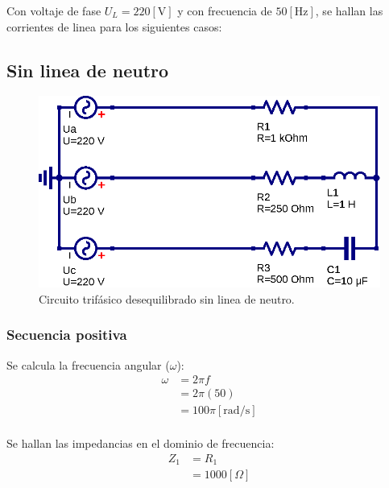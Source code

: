 \documentclass[letter,11pt]{article}
\begin{document}
Con voltaje de fase $U_L=220[\text{V}]$ y con frecuencia de $50[\text{Hz}]$,
se hallan las corrientes de linea para los siguientes casos:
\\

\subsection{Sin linea de neutro}
\begin{figure}[!h]
\centering
\includegraphics[scale=0.9]{figura1.eps}
\caption{Circuito trifásico desequilibrado sin linea de neutro.}
\label{simulacion1}
\end{figure}

\subsubsection{Secuencia positiva}
Se calcula la frecuencia angular ($\omega$):
\begin{equation*}
    \begin{split}
        \omega&=2\pi f\\
              &=2\pi(50)\\
              &=100\pi[\text{rad}/\text{s}]\\
    \end{split}
\end{equation*}

Se hallan las impedancias en el dominio de frecuencia:
\begin{equation*}
    \begin{split}
        Z_1 &= R_1\\
            &= 1000[\Omega]\\
    \end{split}
\end{equation*}
\end{document}
